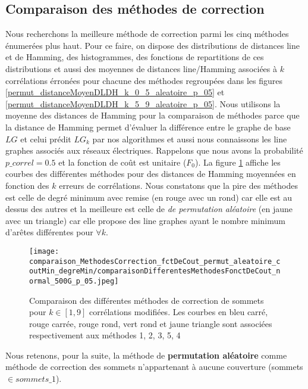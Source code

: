 \documentclass[onecolumn, 12pt]{book}
\begin{document}
\subsection{Comparaison des m\'ethodes de correction}
Nous recherchons la meilleure m\'ethode de correction parmi les cinq m\'ethodes \'enumer\'ees plus haut. 
Pour ce faire, on dispose des distributions de distances line et de Hamming, des histogrammes, des fonctions de repartitions de ces distributions et aussi des moyennes de distances line/Hamming associ\'ees \`a $k$ corr\'elations \'erron\'ees pour chacune des m\'ethodes regroup\'ees dans les figures \ref{permut_distanceMoyenDLDH_k_0_5_aleatoire_p_05} et \ref{permut_distanceMoyenDLDH_k_5_9_aleatoire_p_05}.  
Nous utilisons la moyenne des distances de Hamming pour la comparaison de m\'ethodes parce que la distance de Hamming permet d'\'evaluer la diff\'erence entre le graphe de base $LG$ et celui pr\'edit $LG_k$ par nos algorithmes et aussi nous connaissons les line graphes associ\'es aux r\'eseaux \'electriques.\newline
Rappelons que nous avons la probabilit\'e $p\_correl=0.5$ et la fonction de co\^ut est unitaire ($F_0$).
La figure \ref{compareDifferentesMethodesCorrectionSommets_fct_cout_unitaire_p05} affiche les courbes  des diff\'erentes m\'ethodes pour des distances de Hamming moyenn\'ees en fonction des $k$ erreurs de corr\'elations.
\newline
Nous constatons  que la pire des m\'ethodes est celle de degr\'e minimum avec remise (en rouge avec un rond) car elle est au dessus des autres et la meilleure est celle de {\em de permutation al\'eatoire} (en jaune avec un triangle) car elle propose des line graphes ayant  le nombre minimum d'ar\^etes diff\'erentes pour $ \forall k$.\newline
\begin{figure}[htb!] 
\centering
\texttt{[image: comparaison\_MethodesCorrection\_fctDeCout\_permut\_aleatoire\_coutMin\_degreMin/comparaisonDifferentesMethodesFonctDeCout\_normal\_500G\_p\_05.jpeg]}
\caption{ Comparaison des diff\'erentes m\'ethodes de correction de sommets pour $k \in [1,9]$ corr\'elations modifi\'ees. Les courbes en bleu carr\'e, rouge carr\'ee, rouge rond, vert rond et jaune triangle sont associ\'ees respectivement aux m\'ethodes 1, 2, 3, 5, 4 }
\label{compareDifferentesMethodesCorrectionSommets_fct_cout_unitaire_p05} 
\end{figure}
Nous retenons, pour la suite, la m\'ethode de {\bf permutation al\'eatoire} comme m\'ethode de correction des sommets n'appartenant \`a aucune couverture (sommets $\in sommets\_1$).
\newline
\end{document}
